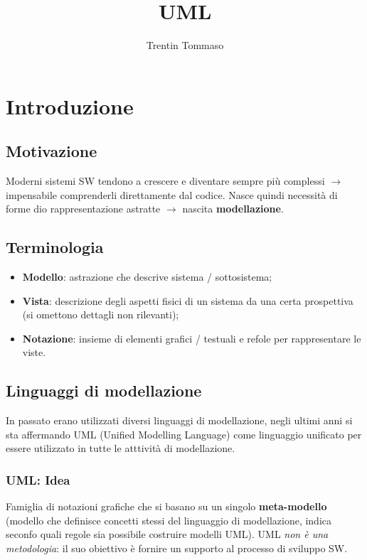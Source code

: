 \documentclass{article}
\title{UML}
\author{Trentin Tommaso}
\begin{document}
  \maketitle
  \tableofcontents
  \newpage
  \section{Introduzione}
    \subsection{Motivazione}
      Moderni sistemi SW tendono a crescere e diventare sempre più complessi $\rightarrow$ impensabile comprenderli direttamente dal codice. Nasce quindi necessità di forme dio rappresentazione astratte $\rightarrow$ nascita \textbf{modellazione}.  
    \subsection{Terminologia}
      \begin{itemize}
        \item \textbf{Modello}: astrazione che descrive sistema / sottosistema;
        \item \textbf{Vista}: descrizione degli aspetti fisici di un sistema da una certa prospettiva (si omettono dettagli non rilevanti);
        \item \textbf{Notazione}: insieme di elementi grafici / testuali e refole per rappresentare le viste.
      \end{itemize}
    \subsection{Linguaggi di modellazione}
      In passato erano utilizzati diversi linguaggi di modellazione, negli ultimi anni si sta affermando UML (Unified Modelling Language) come linguaggio unificato per essere utilizzato in tutte le atttività di modellazione. 
      \subsubsection{UML: Idea}
        Famiglia di notazioni grafiche che si basano su un singolo \textbf{meta-modello} (modello che definisce concetti stessi del linguaggio di modellazione, indica seconfo quali regole sia possibile costruire modelli UML). UML \textit{non è una metodologia}: il suo obiettivo è fornire un supporto al processo di sviluppo SW. 
\end{document}
